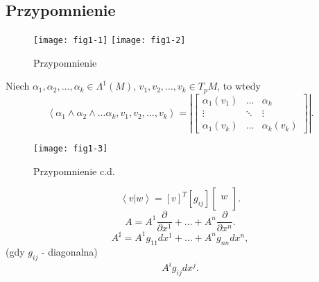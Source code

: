 \documentclass[../main.tex]{subfiles}
\begin{document}
    \subsection{Przypomnienie}
    \begin{figure}[h]
        \texttt{[image: fig1-1]}
        \texttt{[image: fig1-2]}
        \caption{Przypomnienie}
        \label{fig:fig1-1}
    \end{figure}
    Niech $\alpha_1, \alpha_2, \ldots, \alpha_k \in \Lambda^1(M)$, $v_1, v_2, \ldots, v_k \in T_pM$, to wtedy
    \[
        \left<\alpha_1\land \alpha_2\land \ldots\alpha_k, v_1, v_2, \ldots, v_k \right> = \left| \begin{bmatrix} \alpha_1(v_1) & \ldots & \alpha_k\\ \vdots & \ddots & \vdots\\ \alpha_1(v_k) & \ldots & \alpha_k(v_k) \end{bmatrix} \right|
    .\]
    \begin{figure}[h]
        \centering
        \texttt{[image: fig1-3]}
        \caption{Przypomnienie c.d.}
        \label{fig:fig1-3}
    \end{figure}
    \[
        \left< v | w \right> = [v]^T [g_{ij}] \begin{bmatrix} \\w \\ \\ \end{bmatrix}
    .\]
\[
    A = A^1 \frac{\partial }{\partial x^1} + \ldots + A^n \frac{\partial }{\partial x^n}
.\]
\[
A^\sharp = A^1g_{11}dx^1 + \ldots + A^ng_{nn}dx^n
,\]
(gdy $g_{ij}$ - diagonalna)
\[
    A^ig_{ij}dx^j
.\]
\pagebreak
\end{document}

